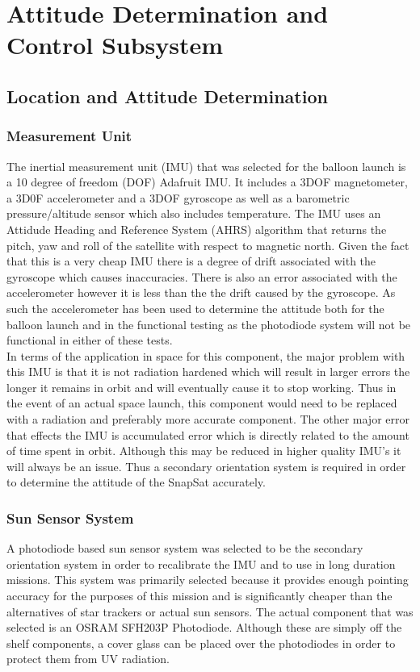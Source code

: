 \section{Attitude Determination and Control Subsystem}
\subsection{Location and Attitude Determination}
\subsubsection{ Measurement Unit}
The inertial measurement unit (IMU) that was selected for the balloon launch is a 10 degree of freedom (DOF) Adafruit IMU.  It includes a 3DOF magnetometer, a 3D0F accelerometer and a 3DOF gyroscope as well as a barometric pressure/altitude sensor which also includes temperature.  The IMU uses an Attidude Heading and Reference System (AHRS) algorithm that returns the pitch, yaw and roll of the satellite with respect to magnetic north.  Given the fact that this is a very cheap IMU there is a degree of drift associated with the gyroscope which causes inaccuracies.  There is also an error associated with the accelerometer however it is less than the the drift caused by the gyroscope. As such the accelerometer has been used to determine the attitude both for the balloon launch and in the functional testing as the photodiode system will not be functional in either of these tests.\\


In terms of the application in space for this component, the major problem with this IMU is that it is not radiation hardened which will result in larger errors the longer it remains in orbit and will eventually cause it to stop working.  Thus in the event of an actual space launch, this component would need to be replaced with a radiation and preferably more accurate component.  The other major error that effects the IMU is accumulated error which is directly related to the amount of time spent in orbit.  Although this may be reduced in higher quality IMU's it will always be an issue.  Thus a secondary orientation system is required in order to determine the attitude of the SnapSat accurately.

\subsubsection{Sun Sensor System}
A photodiode based sun sensor system was selected to be the secondary orientation system in order to recalibrate the IMU and to use in long duration missions.  This system was primarily selected because it provides enough pointing accuracy for the purposes of this mission and is significantly cheaper than the alternatives of star trackers or actual sun sensors.  The actual component that was selected is an OSRAM SFH203P Photodiode.  Although these are simply off the shelf components, a cover glass can be placed over the photodiodes in order to protect them from UV radiation.



